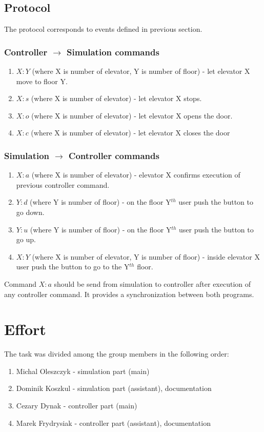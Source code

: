 \documentclass[12pt]{article}
\begin{document}
\subsection{Protocol}
The protocol corresponds to events defined in previous section.

\subsubsection{Controller \(\to\) Simulation commands}
\begin{enumerate}
	\item $X:Y$ (where X is number of elevator, Y is number of floor) - let elevator X move to floor Y.
	\item $X:s$ (where X is number of elevator) - let elevator X stops.
	\item $X:o$ (where X is number of elevator) - let elevator X opens the door.
	\item $X:c$ (where X is number of elevator) - let elevator X closes the door
\end{enumerate}


\subsubsection{Simulation \(\to\) Controller commands}
\begin{enumerate}
	\item $X:a$ (where X is number of elevator) - elevator X confirms execution of previous controller command.
	\item $Y:d$ (where Y is number of floor) - on the floor Y$^{th}$ user push the button to go down.
	\item $Y:u$ (where Y is number of floor) - on the floor Y$^{th}$ user push the button to go up.
	\item $X:Y$ (where X is number of elevator, Y is number of floor) - inside elevator X user push the button to go to the Y$^{th}$ floor.
\end{enumerate}	

Command $X:a$ should be send from simulation to controller after execution of any controller command. It provides a synchronization between both programs.

\section{Effort}
The task was divided among the group members in the following order:
\begin{enumerate}
\item Michal Oleszczyk - simulation part (main)
\item Dominik Koszkul - simulation part (assistant), documentation
\item Cezary Dynak - controller part (main)
\item Marek Frydrysiak - controller part (assistant), documentation
\end{enumerate}
\end{document}
